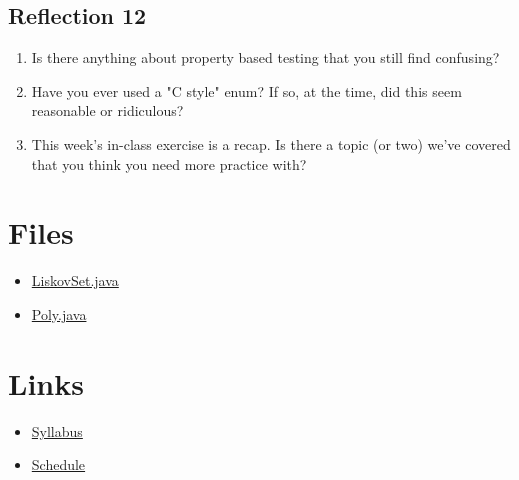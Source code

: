 \documentclass[11pt]{article}
\begin{document}
\subsection{Reflection 12}
\label{sec:orgac212d2}


\begin{enumerate}
\item Is there anything about property based testing that you still find confusing?
\item Have you ever used a "C style" enum? If so, at the time, did this seem reasonable or ridiculous?
\item This week's in-class exercise is a recap. Is there a topic (or two) we've covered that you think you need more practice with?
\end{enumerate}

\section{Files}
\label{sec:org9c46194}
\begin{itemize}
\item \href{./files/LiskovSet.java}{LiskovSet.java}
\item \href{./files/Poly.java}{Poly.java}
\end{itemize}


\section{Links}
\label{sec:orgc206b1d}
\begin{itemize}
\item \href{./index.html}{Syllabus}
\item \href{./schedule.html}{Schedule}
\end{itemize}
\end{document}
